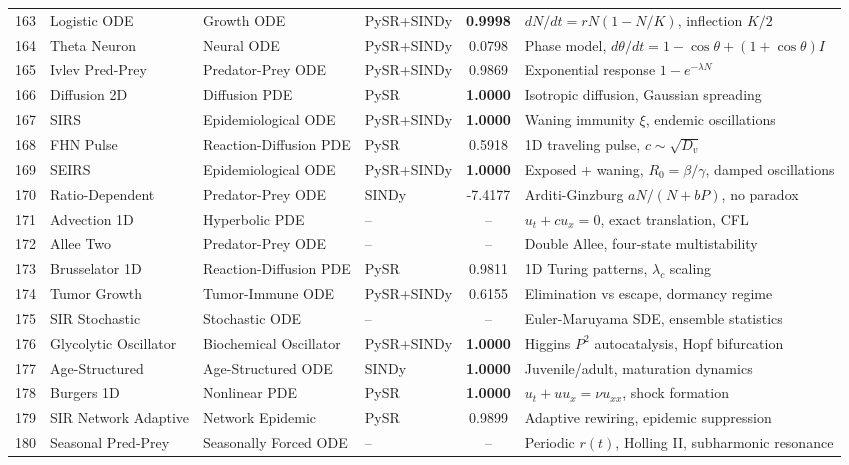 \begin{table}[t]
\begin{tabular}{rlllcl}
163 & Logistic ODE & Growth ODE & PySR+SINDy & \textbf{0.9998} & $dN/dt = rN(1-N/K)$, inflection $K/2$ \\
164 & Theta Neuron & Neural ODE & PySR+SINDy & 0.0798 & Phase model, $d\theta/dt = 1-\cos\theta + (1+\cos\theta)I$ \\
165 & Ivlev Pred-Prey & Predator-Prey ODE & PySR+SINDy & 0.9869 & Exponential response $1-e^{-\lambda N}$ \\
166 & Diffusion 2D & Diffusion PDE & PySR & \textbf{1.0000} & Isotropic diffusion, Gaussian spreading \\
167 & SIRS & Epidemiological ODE & PySR+SINDy & \textbf{1.0000} & Waning immunity $\xi$, endemic oscillations \\
168 & FHN Pulse & Reaction-Diffusion PDE & PySR & 0.5918 & 1D traveling pulse, $c \sim \sqrt{D_v}$ \\
169 & SEIRS & Epidemiological ODE & PySR+SINDy & \textbf{1.0000} & Exposed + waning, $R_0 = \beta/\gamma$, damped oscillations \\
170 & Ratio-Dependent & Predator-Prey ODE & SINDy & -7.4177 & Arditi-Ginzburg $aN/(N+bP)$, no paradox \\
171 & Advection 1D & Hyperbolic PDE & -- & -- & $u_t + cu_x = 0$, exact translation, CFL \\
172 & Allee Two & Predator-Prey ODE & -- & -- & Double Allee, four-state multistability \\
173 & Brusselator 1D & Reaction-Diffusion PDE & PySR & 0.9811 & 1D Turing patterns, $\lambda_c$ scaling \\
174 & Tumor Growth & Tumor-Immune ODE & PySR+SINDy & 0.6155 & Elimination vs escape, dormancy regime \\
175 & SIR Stochastic & Stochastic ODE & -- & -- & Euler-Maruyama SDE, ensemble statistics \\
176 & Glycolytic Oscillator & Biochemical Oscillator & PySR+SINDy & \textbf{1.0000} & Higgins $P^2$ autocatalysis, Hopf bifurcation \\
177 & Age-Structured & Age-Structured ODE & SINDy & \textbf{1.0000} & Juvenile/adult, maturation dynamics \\
178 & Burgers 1D & Nonlinear PDE & PySR & \textbf{1.0000} & $u_t + uu_x = \nu u_{xx}$, shock formation \\
179 & SIR Network Adaptive & Network Epidemic & PySR & 0.9899 & Adaptive rewiring, epidemic suppression \\
180 & Seasonal Pred-Prey & Seasonally Forced ODE & -- & -- & Periodic $r(t)$, Holling II, subharmonic resonance \\

\end{tabular}
\end{table}
